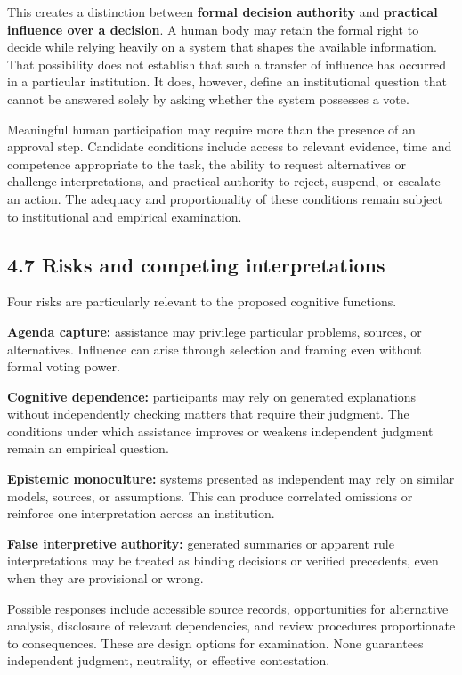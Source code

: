 \documentclass[
  10pt,
]{article}
\begin{document}
This creates a distinction between \textbf{formal decision authority}
and \textbf{practical influence over a decision}. A human body may
retain the formal right to decide while relying heavily on a system that
shapes the available information. That possibility does not establish
that such a transfer of influence has occurred in a particular
institution. It does, however, define an institutional question that
cannot be answered solely by asking whether the system possesses a vote.

Meaningful human participation may require more than the presence of an
approval step. Candidate conditions include access to relevant evidence,
time and competence appropriate to the task, the ability to request
alternatives or challenge interpretations, and practical authority to
reject, suspend, or escalate an action. The adequacy and proportionality
of these conditions remain subject to institutional and empirical
examination.

\subsection{4.7 Risks and competing
interpretations}\label{risks-and-competing-interpretations}

Four risks are particularly relevant to the proposed cognitive
functions.

\textbf{Agenda capture:} assistance may privilege particular problems,
sources, or alternatives. Influence can arise through selection and
framing even without formal voting power.

\textbf{Cognitive dependence:} participants may rely on generated
explanations without independently checking matters that require their
judgment. The conditions under which assistance improves or weakens
independent judgment remain an empirical question.

\textbf{Epistemic monoculture:} systems presented as independent may
rely on similar models, sources, or assumptions. This can produce
correlated omissions or reinforce one interpretation across an
institution.

\textbf{False interpretive authority:} generated summaries or apparent
rule interpretations may be treated as binding decisions or verified
precedents, even when they are provisional or wrong.

Possible responses include accessible source records, opportunities for
alternative analysis, disclosure of relevant dependencies, and review
procedures proportionate to consequences. These are design options for
examination. None guarantees independent judgment, neutrality, or
effective contestation.
\end{document}
